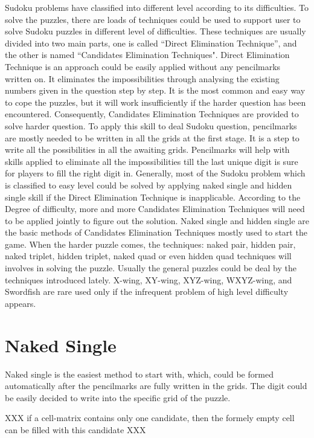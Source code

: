 \documentclass[11pt]{report}
\begin{document}
Sudoku problems have classified into different level according to its difficulties. To solve the puzzles, there are loads of techniques could be used to support user to solve Sudoku puzzles in different level of difficulties.
These techniques are usually divided into two main parts, one is called “Direct Elimination Technique”, and the other is named “Candidates Elimination Techniques".
Direct Elimination Technique is an approach could be easily applied without any pencilmarks written on. It eliminates the impossibilities through analysing the existing numbers given in the question step by step. It is the most common and easy way to cope the puzzles, but it will work insufficiently if the harder question has been encountered. 
Consequently, Candidates Elimination Techniques are provided to solve harder question. To apply this skill to deal Sudoku question, pencilmarks are mostly needed to be written in all the grids at the first stage. It is a step to write all the possibilities in all the awaiting grids. Pencilmarks will help with skills applied to eliminate all the impossibilities till the last unique digit is sure for players to fill the right digit in.
Generally, most of the Sudoku problem which is classified to easy level could be solved by applying naked single and hidden single skill if the Direct Elimination Technique is inapplicable. According to the Degree of difficulty, more and more Candidates Elimination Techniques will need to be applied jointly to figure out the solution. 
Naked single and hidden single are the basic methods of Candidates Elimination Techniques mostly used to start the game. When the harder puzzle comes, the techniques: naked pair, hidden pair, naked triplet, hidden triplet, naked quad or even hidden quad techniques will involves in solving the puzzle. Usually the general puzzles could be deal by the techniques introduced lately. X-wing, XY-wing, XYZ-wing, WXYZ-wing, and Swordfish are rare used only if the infrequent problem of high level difficulty appears. 


\section{Naked Single}
\label{sec:Naked Single}

Naked single is the easiest method to start with, which, could be formed automatically after the pencilmarks are fully written in the grids. The digit could be easily decided to write into the specific grid of the puzzle.

XXX if a cell-matrix contains only one candidate, then the formely empty cell can be filled with this candidate XXX
\end{document}
